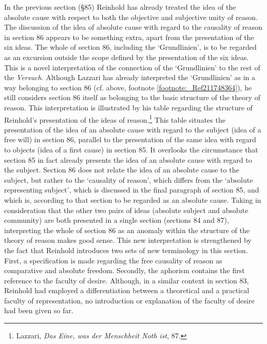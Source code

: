 In the previous section (\S  85) Reinhold has already treated the idea of the absolute cause with respect to both the objective and subjective unity of reason. The discussion of the idea of absolute cause with regard to the causality of reason in section 86 appears to be something extra, apart from the presentation of the six ideas. The whole of section 86, including the `Grundlinien', is to be regarded as an excursion outside the scope defined by the presentation of the six ideas. This is a novel interpretation of the connection of the `Grundlinien' to the rest of the \textit{Versuch}. Although Lazzari has already interpreted the `Grundlinien' as in a way belonging to section 86 (cf. above, footnote \ref{footnote:_Ref211748364}), he still considers section 86 itself as belonging to the basic structure of the theory of reason. This interpretation is illustrated by his table regarding the structure of Reinhold's presentation of the ideas of reason.\footnote{ Lazzari, \textit{Das Eine, was der Menschheit Noth ist}, 87. } This table situates the presentation of the idea of an absolute cause with regard to the subject (idea of a free will) in section 86, parallel to the presentation of the same idea with regard to objects (idea of a first cause) in section 85. It overlooks the circumstance that section 85 in fact already presents the idea of an absolute cause with regard to the subject. Section 86 does not relate the idea of an absolute cause to the subject, but rather to the `causality of reason', which differs from the `absolute representing subject', which is discussed in the final paragraph of section 85, and which is, according to that section to be regarded as an absolute cause. Taking in consideration that the other two pairs of ideas (absolute subject and absolute community) are both presented in a single section (sections 84 and 87), interpreting the whole of section 86 as an anomaly within the structure of the theory of reason makes good sense. This new interpretation is strengthened by the fact that Reinhold introduces two sets of new terminology in this section. First, a specification is made regarding the free causality of reason as comparative and absolute freedom. Secondly, the aphorism contains the first reference to the faculty of desire. Although, in a similar context in section 83, Reinhold had employed a differentiation between a theoretical and a practical faculty of representation, no introduction or explanation of the faculty of desire had been given so far. 

